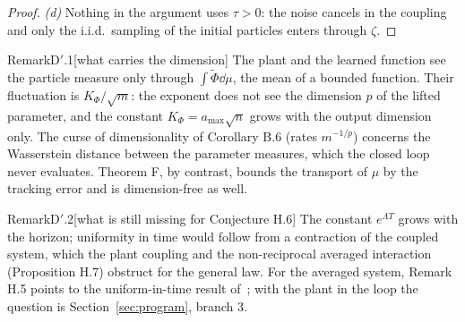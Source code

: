 \begin{proof}
\smallskip
\textit{(d)} Nothing in the argument uses $\tau>0$: the noise cancels in the coupling and only the i.i.d.\ sampling
of the initial particles enters through $\zeta$.
\end{proof}

\begin{rmk}{Remark}{D$'$.1}[what carries the dimension]
The plant and the learned function see the particle measure only through $\int\tilde\Phi\dd\mu$, the mean of a
bounded function. Their fluctuation is $K_\Phi/\sqrt m$: the exponent does not see the dimension $p$ of the lifted
parameter, and the constant $K_\Phi = a_{\max}\sqrt n$ grows with the output dimension only. The curse of
dimensionality of Corollary B.6 (rates $m^{-1/p}$) concerns the Wasserstein distance between the parameter measures,
which the closed loop never evaluates. Theorem F, by contrast, bounds the transport of $\mu$ by the tracking error and
is dimension-free as well.
\end{rmk}

\begin{rmk}{Remark}{D$'$.2}[what is still missing for Conjecture H.6]
The constant $e^{\Lambda T}$ grows with the horizon; uniformity in time would follow from a contraction of the coupled
system, which the plant coupling and the non-reciprocal averaged interaction (Proposition H.7) obstruct for the
general law. For the averaged system, Remark H.5 points to the uniform-in-time result of~\cite{S5}; with the plant in
the loop the question is Section~\ref{sec:program}, branch 3.
\end{rmk}

